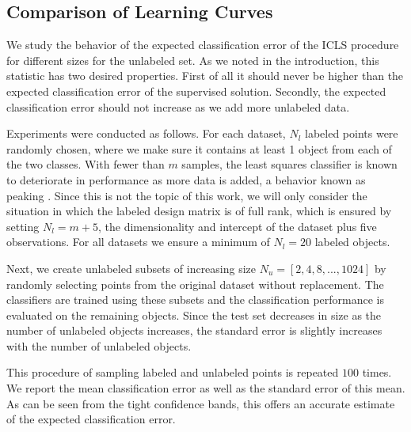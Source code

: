\documentclass[smallcondensed]{svjour3}
\begin{document}
\subsection{Comparison of Learning Curves}
We study the behavior of the expected classification error of the ICLS procedure for different sizes for the unlabeled set. As we noted in the introduction, this statistic has two desired properties. First of all it should never be higher than the expected classification error of the supervised solution. Secondly, the expected classification error should not increase as we add more unlabeled data. 

Experiments were conducted as follows. For each dataset, $N_l$ labeled points were randomly chosen, where we make sure it contains at least 1 object from each of the two classes.  With fewer than $m$ samples, the least squares classifier is known to deteriorate in performance as more data is added, a behavior known as peaking \cite{Raudys1998,Opper1996}. Since this is not the topic of this work, we will only consider the situation in which the labeled design matrix is of full rank, which is ensured by setting $N_l=m+5$, the dimensionality and intercept of the dataset plus five observations. For all datasets we ensure a minimum of $N_l=20$ labeled objects.

Next, we create unlabeled subsets of increasing size $N_u=[2,4,8,...,1024]$ by randomly selecting points from the original dataset without replacement. The classifiers are trained using these subsets and the classification performance is evaluated on the remaining objects. Since the test set decreases in size as the number of unlabeled objects increases, the standard error is slightly increases with the number of unlabeled objects.

This procedure of sampling labeled and unlabeled points is repeated $100$ times. We report the mean classification error as well as the standard error of this mean. As can be seen from the tight confidence bands, this offers an accurate estimate of the expected classification error.

\end{document}
